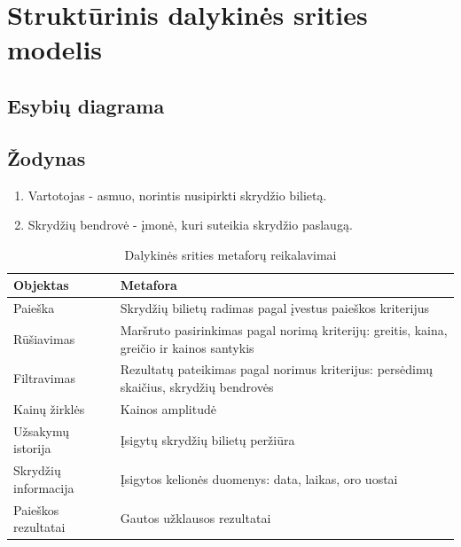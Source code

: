 \documentclass{VUMIFPSkursinis}
\begin{document}
        \section{Struktūrinis dalykinės srities modelis}
            \subsection{Esybių diagrama}
    
            \subsection{Žodynas}
                \begin{enumerate}[label=\textbf{E\arabic*}.]
                    \item Vartotojas - asmuo, norintis nusipirkti skrydžio bilietą.
                    \item Skrydžių bendrovė  - įmonė, kuri suteikia skrydžio paslaugą.
                \end{enumerate}
    
                \begin{table}[H]\footnotesize
                \centering
                \caption{Dalykinės srities metaforų reikalavimai}
                    {\begin{tabular}{|l|l|} \hline
                        Objektas & Metafora \\
                        \hline
                        \hline
                        Paieška & Skrydžių bilietų radimas pagal įvestus paieškos kriterijus \\
                        \hline
                        Rūšiavimas & Maršruto pasirinkimas pagal norimą kriterijų: greitis, kaina, greičio ir kainos santykis \\
                        \hline
                        Filtravimas & Rezultatų pateikimas pagal norimus kriterijus: persėdimų skaičius, skrydžių bendrovės \\
                        \hline
                        Kainų žirklės & Kainos amplitudė \\
                        \hline
                        Užsakymų istorija & Įsigytų skrydžių bilietų peržiūra \\
                        \hline
                        Skrydžių informacija & Įsigytos kelionės duomenys: data, laikas, oro uostai \\
                        \hline
                        Paieškos rezultatai & Gautos užklausos rezultatai \\
                        \hline
                    \end{tabular}}
                \label{tab:table example}
                \end{table}
    
\end{document}

